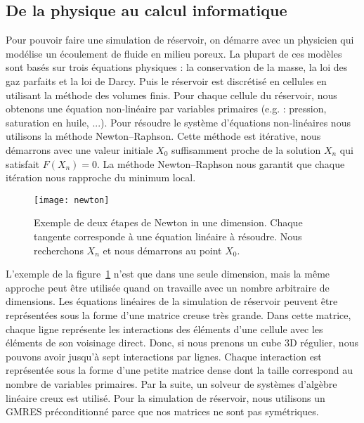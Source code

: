 \subsection{De la physique au calcul informatique}
Pour pouvoir faire une simulation de réservoir, on démarre avec un physicien qui modélise un écoulement de fluide en milieu poreux.
%
La plupart de ces modèles sont basés sur trois équations physiques : la conservation de la masse, la loi des gaz parfaits et la loi de Darcy.
%
Puis le réservoir est discrétisé en cellules en utilisant la méthode des volumes finis.
%
Pour chaque cellule du réservoir, nous obtenons une équation non-linéaire par variables primaires (e.g. : pression, saturation en huile, ...).
%
Pour résoudre le système d'équations non-linéaires nous utilisons la méthode Newton–Raphson.
%
Cette méthode est itérative, nous démarrons avec une valeur initiale $X_0$ suffisamment proche de la solution $X_n$ qui satisfait $F(X_n) = 0$.
%
La méthode Newton–Raphson nous garantit que chaque itération nous rapproche du minimum local.

\begin{figure}[!ht]
  \centering
  \texttt{[image: newton]}
  \caption{Exemple de deux étapes de Newton in une dimension.
    Chaque tangente corresponde à une équation linéaire à résoudre.
    Nous recherchons $X_n$ et nous démarrons au point $X_0$.}
\label{fig:newton}
\end{figure}

L'exemple de la figure~\ref{fig:newton} n'est que dans une seule dimension, mais la même approche peut être utilisée quand on travaille avec un nombre arbitraire de dimensions.
%
Les équations linéaires de la simulation de réservoir peuvent être représentées sous la forme d'une matrice creuse très grande.
%
Dans cette matrice, chaque ligne représente les interactions des éléments d'une cellule avec les éléments de son voisinage direct.
%
Donc, si nous prenons un cube 3D régulier, nous pouvons avoir jusqu'à sept interactions par lignes.
%
Chaque interaction est représentée sous la forme d'une petite matrice dense dont la taille correspond au nombre de variables primaires.
%
Par la suite, un solveur de systèmes d'algèbre linéaire creux est utilisé.
%
Pour la simulation de réservoir, nous utilisons un GMRES préconditionné parce que nos matrices ne sont pas symétriques.

